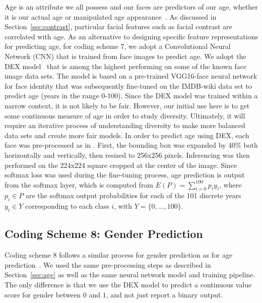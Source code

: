 \documentclass[letterpaper,11pt]{article}
\begin{document}
Age is an attribute we all possess and our faces are predictors of our age, whether it is our actual age or manipulated age appearance~\cite{facial_contrast17}.  As discussed in Section~\ref{sec:contrast}, particular facial features such as facial contrast are correlated with age.  As an alternative to designing specific feature representations for predicting age, for coding scheme 7, we adopt a Convolutional Neural Network (CNN) that is trained from face images to predict age.  We adopt the DEX model~\cite{age_image15,age_image18} that is among the highest performing on some of the known face image data sets.  The model is based on a pre-trained VGG16-face neural network for face identity that was subsequently fine-tuned on the IMDB-wiki data set \cite{age_image18} to predict age (years in the range 0-100). Since the DEX model was trained within a narrow context, it is not likely to be fair.  However, our initial use here is to get some continuous measure of age in order to study diversity.  Ultimately, it will require an iterative process of understanding diversity to make more balanced data sets and create more fair models.  In order to predict age using DEX, each face was pre-processed as in \cite{age_image15}. First, the bounding box was expanded by 40\% both horizontally and vertically, then resized to 256x256 pixels. Inferencing was then performed on the  224x224 square cropped at the center of the image.  Since softmax loss was used during the fine-tuning process, age prediction is output from the softmax layer, which is computed from $E(P) = \sum_{i=0}^{100} p_i y_i$, where $p_i \in P$ are the softmax output probabilities for each of the 101 discrete years $y_i \in Y$ corresponding to each class $i$, with $Y = \{0,...,100\}$.

\subsection{Coding Scheme 8: Gender Prediction}

Coding scheme 8 follows a similar process for gender prediction as for age prediction~\cite{age_image18}.  We used the same pre-processing steps as described in Section~\ref{sec:age} as well as the same neural network model and training pipeline. The only difference is that we use the DEX model to predict a continuous value score for gender between $0$ and $1$, and not just report a binary output.

\end{document}
